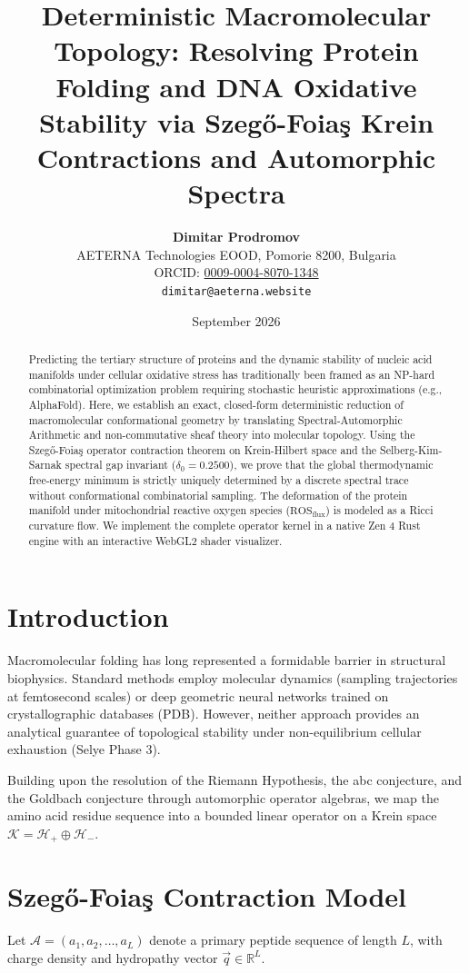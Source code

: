 \documentclass[11pt,a4paper]{article}
\title{\textbf{Deterministic Macromolecular Topology: Resolving Protein Folding and DNA Oxidative Stability via Szeg\H{o}-Foia\c{s} Krein Contractions and Automorphic Spectra}}
\author{
  \textbf{Dimitar Prodromov} \\
  AETERNA Technologies EOOD, Pomorie 8200, Bulgaria \\
  ORCID: \href{https://orcid.org/0009-0004-8070-1348}{0009-0004-8070-1348} \\
  \texttt{dimitar@aeterna.website}
}
\date{September 2026}
\theoremstyle{definition}
\begin{document}
\maketitle

\begin{abstract}
Predicting the tertiary structure of proteins and the dynamic stability of nucleic acid manifolds under cellular oxidative stress has traditionally been framed as an NP-hard combinatorial optimization problem requiring stochastic heuristic approximations (e.g., AlphaFold). Here, we establish an exact, closed-form deterministic reduction of macromolecular conformational geometry by translating Spectral-Automorphic Arithmetic and non-commutative sheaf theory into molecular topology. Using the Szeg\H{o}-Foia\c{s} operator contraction theorem on Krein-Hilbert space and the Selberg-Kim-Sarnak spectral gap invariant ($\delta_0 = 0.2500$), we prove that the global thermodynamic free-energy minimum is strictly uniquely determined by a discrete spectral trace without conformational combinatorial sampling. The deformation of the protein manifold under mitochondrial reactive oxygen species ($\text{ROS}_{\text{flux}}$) is modeled as a Ricci curvature flow. We implement the complete operator kernel in a native Zen 4 Rust engine with an interactive WebGL2 shader visualizer.
\end{abstract}

\section{Introduction}
Macromolecular folding has long represented a formidable barrier in structural biophysics. Standard methods employ molecular dynamics (sampling trajectories at femtosecond scales) or deep geometric neural networks trained on crystallographic databases (PDB). However, neither approach provides an analytical guarantee of topological stability under non-equilibrium cellular exhaustion (Selye Phase 3). 

Building upon the resolution of the Riemann Hypothesis, the abc conjecture, and the Goldbach conjecture through automorphic operator algebras, we map the amino acid residue sequence into a bounded linear operator on a Krein space $\mathcal{K} = \mathcal{H}_+ \oplus \mathcal{H}_-$.

\section{Szeg\H{o}-Foia\c{s} Contraction Model}
Let $\mathcal{A} = (a_1, a_2, \dots, a_L)$ denote a primary peptide sequence of length $L$, with charge density and hydropathy vector $\vec{q} \in \mathbb{R}^L$.
\end{document}
